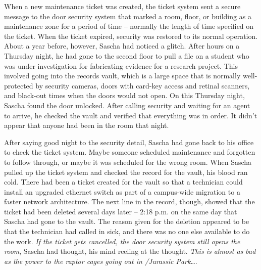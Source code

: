 \documentclass[12pt]{book}
\begin{document}
When a new maintenance ticket was created, the ticket system sent a secure message to the door security system that marked a room, floor, or building as a maintenance zone for a period of time -- normally the length of time specified on the ticket.  When the ticket expired, security was restored to its normal operation.  About a year before, however, Sascha had noticed a glitch.  After hours on a Thursday night, he had gone to the second floor to pull a file on a student who was under investigation for fabricating evidence for a research project.  This involved going into the records vault, which is a large space that is normally well-protected by security cameras, doors with card-key access and retinal scanners, and black-out times when the doors would not open.  On this Thursday night, Sascha found the door unlocked.  After calling security and waiting for an agent to arrive, he checked the vault and verified that everything was in order.  It didn't appear that anyone had been in the room that night.

After saying good night to the security detail, Sascha had gone back to his office to check the ticket system.  Maybe someone scheduled maintenance and forgotten to follow through, or maybe it was scheduled for the wrong room.  When Sascha pulled up the ticket system and checked the record for the vault, his blood ran cold.  There had been a ticket created for the vault so that a technician could install an upgraded ethernet switch as part of a campus-wide migration to a faster network architecture.  The next line in the record, though, showed that the ticket had been deleted several days later -- 2:18 p.m. on the same day that Sascha had gone to the vault.  The reason given for the deletion appeared to be that the technician had called in sick, and there was no one else available to do the work.  \emph{If the ticket gets cancelled, the door security system still opens the room}, Sascha had thought, his mind reeling at the thought.  \emph{This is almost as bad as the power to the raptor cages going out in /Jurassic Park}\dots.
\end{document}
